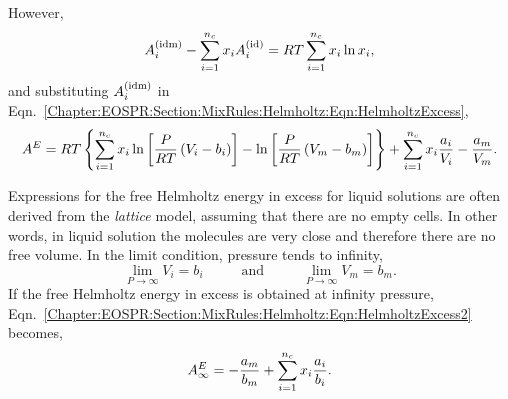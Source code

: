 However,
   \begin{equation}
      \mfr[A]{i}{\text{idm}} - \sum\limits_{i=1}^{n_{c}}x_{i}\mfr[A]{i}{\text{id}} = RT\sum\limits_{i=1}^{n_{c}}x_{i}\ln{x_{i}},
   \end{equation}
and substituting $\mfr[A]{i}{\text{idm}}$ in Eqn.~\ref{Chapter:EOSPR:Section:MixRules:Helmholtz:Eqn:HelmholtzExcess},
   \begin{equation}
      A^{E} = RT\left\{ \sum\limits_{i=1}^{n_{c}}x_{i}\ln{\left[\frc{P}{RT}\left(V_{i}-b_{i}\right)\right]} - \ln{\left[\frc{P}{RT}\left(V_{m}-b_{m}\right)\right]}\right\} + \sum\limits_{i=1}^{n_{c}}x_{i}\frc{a_{i}}{V_{i}} - \frc{a_{m}}{V_{m}}.\label{Chapter:EOSPR:Section:MixRules:Helmholtz:Eqn:HelmholtzExcess2}
   \end{equation}

Expressions for the free Helmholtz energy in excess for liquid solutions are often derived from the {\it lattice} model, assuming that there are no empty cells. In other words, in liquid solution the molecules are very close and therefore there are no free volume. In the limit condition, \ie pressure tends to infinity, 
   \begin{displaymath}
      \lim_{P\rightarrow\infty} V_{i} = b_{i} \hspace{1cm}\text{ and }\hspace{1cm} \lim_{P\rightarrow\infty} V_{m} = b_{m}.
   \end{displaymath}
If the free Helmholtz energy in excess is obtained at infinity pressure, Eqn.~\ref{Chapter:EOSPR:Section:MixRules:Helmholtz:Eqn:HelmholtzExcess2} becomes,
   \begin{equation}
     A_{\infty}^{E} = -\frc{a_{m}}{b_{m}} + \sum\limits_{i=1}^{n_{c}}x_{i}\frc{a_{i}}{b_{i}}.
   \end{equation}

